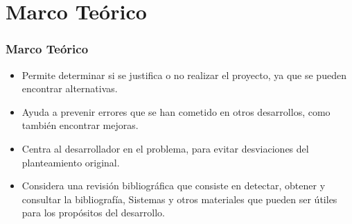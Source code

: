 \documentclass[aspectratio=169]{beamer}%
\newcommand\naranjo[1]{\textcolor[RGB]{251,79,20}{#1}}
\begin{document}
\section{Marco Teórico}
\begin{frame}[fragile]
\frametitle{\textbf{Marco Teórico}}
\justifying
\begin{itemize}

 \item Permite determinar si se justifica o no realizar el proyecto, ya que se pueden encontrar alternativas.
  \item Ayuda a prevenir errores que se han cometido en otros desarrollos, como también encontrar mejoras.
 \item Centra al desarrollador en el problema, para evitar desviaciones del planteamiento original.

\item Considera una \naranjo{revisión bibliográfica} que consiste en detectar, obtener y consultar la bibliografía, Sistemas y otros materiales que pueden ser útiles para los propósitos del desarrollo.
\end{itemize}

\end{frame}
\end{document}
